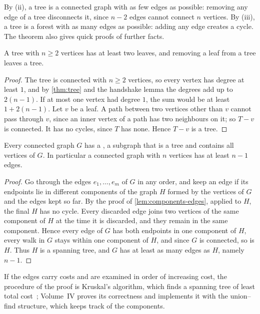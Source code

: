 By (ii), a tree is a connected graph with as few edges as possible: removing any edge of a tree disconnects it, since $n-2$ edges cannot connect $n$ vertices. By (iii), a tree is a forest with as many edges as possible: adding any edge creates a cycle. The theorem also gives quick proofs of further facts.

\begin{corollary}
\label{cor:leaves}
A tree with $n\ge2$ vertices has at least two leaves, and removing a leaf from a tree leaves a tree.
\end{corollary}

\begin{proof}
The tree is connected with $n\ge2$ vertices, so every vertex has degree at least $1$, and by \cref{thm:tree} and the handshake lemma the degrees add up to $2(n-1)$. If at most one vertex had degree $1$, the sum would be at least $1+2(n-1)$. Let $v$ be a leaf. A path between two vertices other than $v$ cannot pass through $v$, since an inner vertex of a path has two neighbours on it; so $T-v$ is connected. It has no cycles, since $T$ has none. Hence $T-v$ is a tree.
\end{proof}

\begin{corollary}
\label{cor:spanning-tree}
Every connected graph $G$ has a , a subgraph that is a tree and contains all vertices of $G$. In particular a connected graph with $n$ vertices has at least $n-1$ edges.
\end{corollary}

\begin{proof}
Go through the edges $e_1,\ldots,e_m$ of $G$ in any order, and keep an edge if its endpoints lie in different components of the graph $H$ formed by the vertices of $G$ and the edges kept so far. By the proof of \cref{lem:components-edges}, applied to $H$, the final $H$ has no cycle. Every discarded edge joins two vertices of the same component of $H$ at the time it is discarded, and they remain in the same component. Hence every edge of $G$ has both endpoints in one component of $H$, every walk in $G$ stays within one component of $H$, and since $G$ is connected, so is $H$. Thus $H$ is a spanning tree, and $G$ has at least as many edges as $H$, namely $n-1$.
\end{proof}

If the edges carry costs and are examined in order of increasing cost, the procedure of the proof is Kruskal's algorithm, which finds a spanning tree of least total cost~\cite{kruskal1956}; Volume~IV proves its correctness and implements it with the union--find structure, which keeps track of the components.

